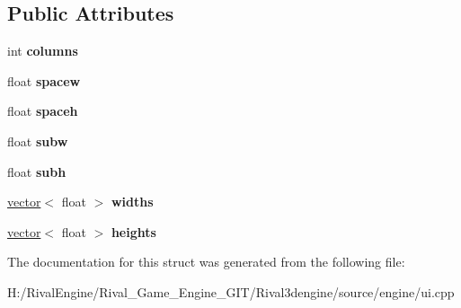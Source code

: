 \subsection*{Public Attributes}
\begin{DoxyCompactItemize}
\item 
\mbox{\label{struct_u_i_1_1_grid_a6d54ef76d1b8149de22bdc21ae5247a5}} 
int {\bfseries columns}
\item 
\mbox{\label{struct_u_i_1_1_grid_a05c2aba53a171263a596a3590597f0f3}} 
float {\bfseries spacew}
\item 
\mbox{\label{struct_u_i_1_1_grid_a55dc1d2769ea4c5e9cfe5e4d3e54fc29}} 
float {\bfseries spaceh}
\item 
\mbox{\label{struct_u_i_1_1_grid_a8e171bc821d6f6ced9a1fd77cf1140e0}} 
float {\bfseries subw}
\item 
\mbox{\label{struct_u_i_1_1_grid_aff66d17be070d390c8e806d8bd3b3081}} 
float {\bfseries subh}
\item 
\mbox{\label{struct_u_i_1_1_grid_a70db1c7be6a74d3f6040aaa3e8954be8}} 
\hyperlink{structvector}{vector}$<$ float $>$ {\bfseries widths}
\item 
\mbox{\label{struct_u_i_1_1_grid_a9b3be6f075167bcc208890c3d07dd848}} 
\hyperlink{structvector}{vector}$<$ float $>$ {\bfseries heights}
\end{DoxyCompactItemize}


The documentation for this struct was generated from the following file\+:\begin{DoxyCompactItemize}
\item 
H\+:/\+Rival\+Engine/\+Rival\+\_\+\+Game\+\_\+\+Engine\+\_\+\+G\+I\+T/\+Rival3dengine/source/engine/ui.\+cpp\end{DoxyCompactItemize}

